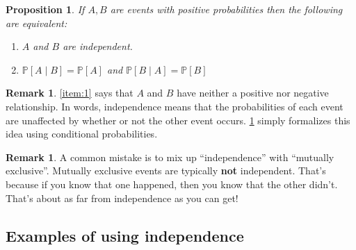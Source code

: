 \documentclass[10pt]{article}
\newtheorem{proposition}[theorem]{Proposition}
\theoremstyle{definition}
\newtheorem{remark}[theorem]{Remark}
\newtheorem{example}[theorem]{Example}
\renewenvironment{example}
{\begin{oldexample}}
  {\par\smallskip\hfill   End of Example~\theexample. $\square$    \par\end{oldexample}}
\newcommand{\fl}{\noindent\textbf} %
\newcommand{\1}[1]{\textbf{1}_{\left[#1\right]}} %
\def\P{\mathbb{P}} %
\begin{document}
\begin{proposition}
  \label{prop:independence-interpretation}
  If $A,B$ are events with positive probabilities then the following are
  equivalent:
  \begin{enumerate}[label=\rm{(\roman*.)}]
    \item $A$ and $B$ are independent.
    \item \label{item:1} $\P\left[A\mid B \right] = \P\left[A \right]$
    and $\P\left[B\mid A \right] = \P\left[B \right]$ 
  \end{enumerate}
\end{proposition}
\begin{remark}
  \ref{item:1} says that $A$ and $B$ have neither a positive nor negative
  relationship. In words, independence means that the probabilities of each
  event are unaffected by whether or not the other event occurs.
  \cref{prop:independence-interpretation} simply formalizes this idea using
  conditional probabilities.
\end{remark}

\begin{remark}
  A common mistake is to mix up ``independence'' with ``mutually exclusive''.
  Mutually exclusive events are typically \textbf{not} independent. That's because if
  you know that one happened, then you know that the other didn't. That's
  about as far from independence as you can get!
\end{remark}
\subsection{Examples of using independence}

\end{document}
